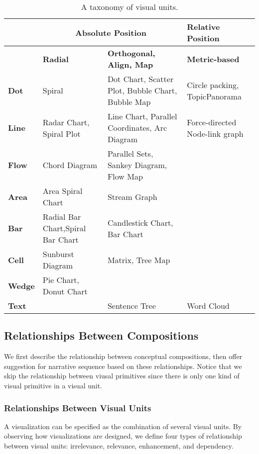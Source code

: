 \begin{table}[tb]
  \caption{A taxonomy of visual units.}
  \label{tab:unit}
  \small
  \centering
  \begin{tabular}{p{1.2cm}|p{1.6cm}|p{1.6cm}|p{1.6cm}}
  \toprule
  \textbf{} &\multicolumn{2}{|c|}{\textbf{Absolute Position}} &\textbf{Relative Position}   \\ 
  \midrule
 \textbf{} &\textbf{Radial} &\textbf{Orthogonal, Align, Map} &\textbf{Metric-based}   \\ 
  \midrule
  \textbf{Dot} &Spiral&Dot Chart, Scatter Plot, Bubble Chart, Bubble Map &Circle packing, TopicPanorama\cite{7042494}\\
  \midrule
  \textbf{Line}&  Radar Chart, Spiral Plot    &Line Chart, Parallel Coordinates, Arc Diagram &  Force-directed Node-link graph   \\ 
  \midrule
   \textbf{Flow}&  Chord Diagram   &Parallel Sets, Sankey Diagram, 
   Flow Map  & \\
  \midrule
  \textbf{Area}&  Area Spiral Chart &Stream Graph &  \\ 
  \midrule
  \textbf{Bar}&      Radial Bar Chart,Spiral Bar Chart  & Candlestick Chart, Bar Chart  &   \\
  \midrule
  \textbf{Cell}& Sunburst Diagram  &Matrix, Tree Map &  \\
  \midrule
  \textbf{Wedge}& Pie Chart, Donut Chart &  &  \\
  \midrule
  \textbf{Text}&    &  Sentence Tree  & Word Cloud \\
  \bottomrule
  
  \end{tabular}
  \vspace{1mm}
\end{table}

\subsection{Relationships Between Compositions}
We first describe the relationship between conceptual compositions, then offer suggestion for narrative sequence based on these relationships. Notice that we skip the relationship between viusal primitives since there is only one kind of visual primitive in a visual unit. 
\subsubsection{Relationships Between Visual Units}
A visualization can be specified as the combination of several visual units. 
By observing how visualizations are designed,
we define four types of relationship between visual units: irrelevance, relevance, enhancement, and dependency. 

